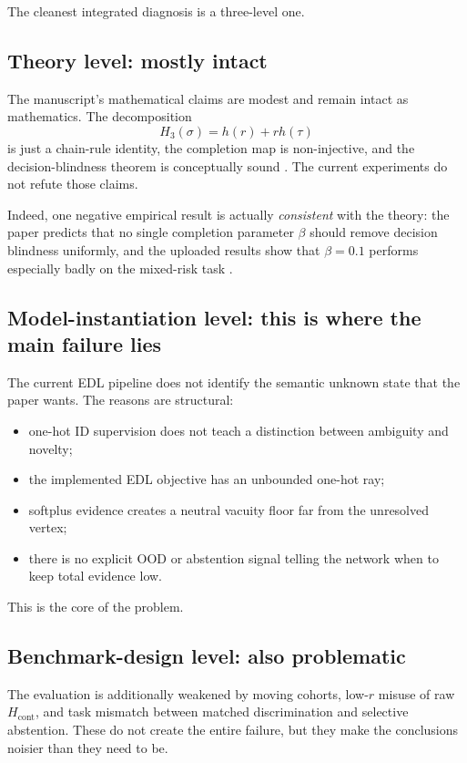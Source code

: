 \documentclass[11pt]{article}
\begin{document}
The cleanest integrated diagnosis is a three-level one.

\subsection*{Theory level: mostly intact}

The manuscript's mathematical claims are modest and remain intact as mathematics. The decomposition
\[
H_3(\sigma)=h(r)+r h(\tau)
\]
is just a chain-rule identity, the completion map is non-injective, and the decision-blindness theorem is conceptually sound \cite{draft}. The current experiments do not refute those claims.

Indeed, one negative empirical result is actually \emph{consistent} with the theory: the paper predicts that no single completion parameter $\beta$ should remove decision blindness uniformly, and the uploaded results show that $\beta=0.1$ performs especially badly on the mixed-risk task \cite{draft,csv-risk}.

\subsection*{Model-instantiation level: this is where the main failure lies}

The current EDL pipeline does not identify the semantic unknown state that the paper wants. The reasons are structural:

\begin{itemize}[leftmargin=1.5em]
  \item one-hot ID supervision does not teach a distinction between ambiguity and novelty;
  \item the implemented EDL objective has an unbounded one-hot ray;
  \item softplus evidence creates a neutral vacuity floor far from the unresolved vertex;
  \item there is no explicit OOD or abstention signal telling the network when to keep total evidence low.
\end{itemize}

This is the core of the problem.

\subsection*{Benchmark-design level: also problematic}

The evaluation is additionally weakened by moving cohorts, low-$r$ misuse of raw $H_{\mathrm{cont}}$, and task mismatch between matched discrimination and selective abstention. These do not create the entire failure, but they make the conclusions noisier than they need to be.
\end{document}
